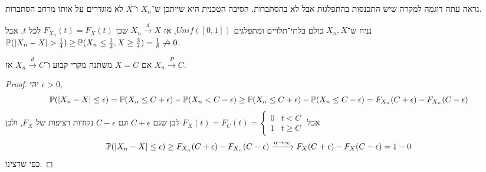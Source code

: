 נראה עתה דוגמה למקרה שיש התכנסות בהתפלגות אבל לא בהסתברות.
הסיבה הטכנית היא שייתכן ש־$X_n$ ו־$X$ לא מוגדרים על אותו מרחב הסתברות.
\begin{example}
	נניח ש־$X_n, X$ כולם בלתי־תלויים ומתפלגים $Unif([0, 1])$, אז $X_n \xrightarrow{d} X$ שכן $F_{X_n}(t) = F_X(t)$ לכל $t$,
	אבל $\mathbb{P}(|X_n - X| > \frac{1}{4}) \ge \mathbb{P}(X_n \le \frac{1}{2}, X \ge \frac{3}{4}) = \frac{1}{8} \not\to 0$.
\end{example}
\begin{proposition}
	אם $X = C$ משתנה מקרי קבוע ו־$X_n \xrightarrow{d} C$ אז $X_n \xrightarrow{P} C$.
\end{proposition}
\begin{proof}
	יהי $\epsilon > 0$,
	\[
		\mathbb{P}(|X_n - X| \le \epsilon)
		= \mathbb{P}(X_n \le C + \epsilon) - \mathbb{P}(X_n < C - \epsilon)
		\ge \mathbb{P}(X_n \le C + \epsilon) - \mathbb{P}(X_n \le C - \epsilon)
		= F_{X_n}(C + \epsilon) - F_{X_n}(C - \epsilon)
	\]
	אבל $F_X(t) = F_C(t) = \begin{cases}
		0 & t < C \\
		1 & t \ge C
	\end{cases}$
	לכן שגם $C + \epsilon$ וגם $C - \epsilon$ נקודות רציפות של $F_X$,
	ולכן
	\[
		\mathbb{P}(|X_n - X| \le \epsilon)
		\ge F_{X_n}(C + \epsilon) - F_{X_n}(C - \epsilon)
		\xrightarrow{n \to \infty} F_X(C + \epsilon) - F_X(C - \epsilon)
		= 1 - 0
	\]
	כפי שרצינו.
\end{proof}

